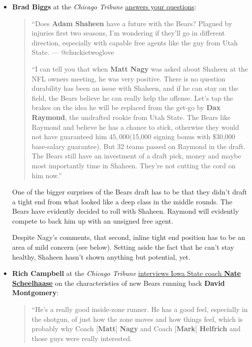 \documentclass[11pt]{article}
\author{Tom Shannon}
\date{\today}
\title{}
\begin{document}
\begin{itemize}
\item \textbf{Brad Biggs} at the \textit{Chicago Tribune} \href{https://www.chicagotribune.com/sports/football/bears/ct-spt-bears-mailbag-stephen-denmark-david-montgomery-biggs-20190501-story.html}{answers your questions}:

\begin{quote}
  ``Does \textbf{Adam Shaheen} have a future with the Bears? Plagued by injuries first two seasons, I’m wondering if they’ll go in different direction, especially with capable free agents like the guy from Utah State. — @chuckietwoglove

``I can tell you that when \textbf{Matt Nagy} was asked about Shaheen at the NFL owners meeting, he was very positive. There is no question durability has been an issue with Shaheen, and if he can stay on the field, the Bears believe he can really help the offense. Let’s tap the brakes on the idea he will be replaced from the get-go by \textbf{Dax Raymond}, the undrafted rookie from Utah State. The Bears like Raymond and believe he has a chance to stick, otherwise they would not have guaranteed him $45,000 ($15,000 signing bonus with \$30,000 base-salary guarantee). But 32 teams passed on Raymond in the draft. The Bears still have an investment of a draft pick, money and maybe most importantly time in Shaheen. They’re not cutting the cord on him now.''
\end{quote}

One of the bigger surprises of the Bears draft has to be that they didn't draft a tight end from what looked like a deep class in the middle rounds.  The Bears have evidently decided to roll with Shaheen.  Raymond will evidently compete to back him up with an unsigned free agent.

Despite Nagy's comments, that second, inline tight end position has to be an area of mild concern (see below).  Setting aside the fact that he can't stay healthy, Shaheen hasn't shown anything but potential, yet.

\item \textbf{Rich Campbell} at the \textit{Chicago Tribune} \href{https://www.chicagotribune.com/sports/football/bears/ct-spt-bears-david-montgomery-position-coach-20190430-story.html}{interviews Iowa State coach \textbf{Nate Scheelhaase}} on the characteristics of new Bears running back \textbf{David Montgomery}:

\begin{quote}
``He’s a really good inside-zone runner. He has a good feel, especially in the shotgun, of just how the zone moves and how things feel, which is probably why Coach [\textbf{Matt}] \textbf{Nagy} and Coach [\textbf{Mark}] \textbf{Helfrich} and those guys were really interested.


\end{quote}
\end{itemize}
\end{document}
